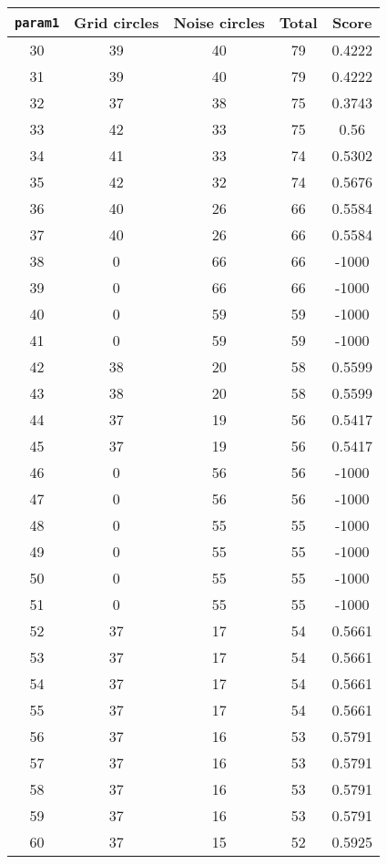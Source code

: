 \documentclass[letterpaper, 12pt]{article}
\begin{document}
\begin{longtable}{|c|c|c|c|c|}
\hline
\textbf{\texttt{param1}} & \textbf{Grid circles} & \textbf{Noise circles} & \textbf{Total} & \textbf{Score} \\
\hline
30 & 39 & 40 & 79 & 0.4222 \\
\hline
31 & 39 & 40 & 79 & 0.4222 \\
\hline
32 & 37 & 38 & 75 & 0.3743 \\
\hline
33 & 42 & 33 & 75 & 0.56 \\
\hline
34 & 41 & 33 & 74 & 0.5302 \\
\hline
35 & 42 & 32 & 74 & 0.5676 \\
\hline
36 & 40 & 26 & 66 & 0.5584 \\
\hline
37 & 40 & 26 & 66 & 0.5584 \\
\hline
38 & 0 & 66 & 66 & -1000 \\
\hline
39 & 0 & 66 & 66 & -1000 \\
\hline
40 & 0 & 59 & 59 & -1000 \\
\hline
41 & 0 & 59 & 59 & -1000 \\
\hline
42 & 38 & 20 & 58 & 0.5599 \\
\hline
43 & 38 & 20 & 58 & 0.5599 \\
\hline
44 & 37 & 19 & 56 & 0.5417 \\
\hline
45 & 37 & 19 & 56 & 0.5417 \\
\hline
46 & 0 & 56 & 56 & -1000 \\
\hline
47 & 0 & 56 & 56 & -1000 \\
\hline
48 & 0 & 55 & 55 & -1000 \\
\hline
49 & 0 & 55 & 55 & -1000 \\
\hline
50 & 0 & 55 & 55 & -1000 \\
\hline
51 & 0 & 55 & 55 & -1000 \\
\hline
52 & 37 & 17 & 54 & 0.5661 \\
\hline
53 & 37 & 17 & 54 & 0.5661 \\
\hline
54 & 37 & 17 & 54 & 0.5661 \\
\hline
55 & 37 & 17 & 54 & 0.5661 \\
\hline
56 & 37 & 16 & 53 & 0.5791 \\
\hline
57 & 37 & 16 & 53 & 0.5791 \\
\hline
58 & 37 & 16 & 53 & 0.5791 \\
\hline
59 & 37 & 16 & 53 & 0.5791 \\
\hline
60 & 37 & 15 & 52 & 0.5925 \\
\hline

\end{longtable}
\end{document}
